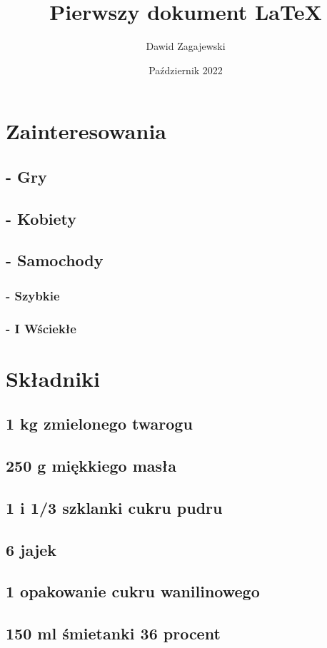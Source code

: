 \documentclass[12pt, letterpaper, titlepage]{article}
\title{Pierwszy dokument LaTeX}
\author{Dawid Zagajewski}
\date{Październik 2022}
\begin{document}
\maketitle
\section{Zainteresowania}
\subsection{- Gry}
\subsection{- Kobiety}
\subsection{- Samochody}
\subsubsection{- Szybkie}
\subsubsection{- I Wściekłe }
\newpage

\section{Składniki}
\subsection{1 kg zmielonego twarogu}
\subsection{250 g miękkiego masła}
\subsection{1 i 1/3 szklanki cukru pudru}
\subsection{6 jajek}
\subsection{1 opakowanie cukru wanilinowego}
\subsection{150 ml śmietanki 36 procent}
\end{document}
